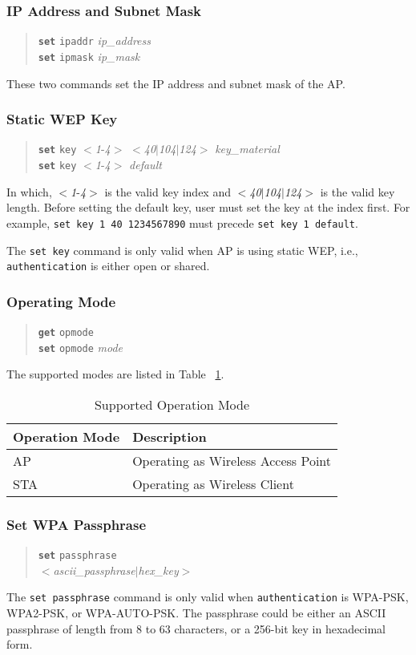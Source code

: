 \documentclass[10pt,fullpage]{article}
\newcommand{\mytt}[1]{{\texttt{#1}}}
\newcommand{\bv}{\begin{verse}}
\newcommand{\ev}{\end{verse}}
\newcommand{\clicmd}[1]{{\textbf{\texttt{#1}}}}
\newcommand{\cliparam}[1]{{\texttt{#1}}}
\newcommand{\clival}[1]{{\emph{#1}}}
\begin{document}
\subsubsection{IP Address and Subnet Mask}
\bv
\clicmd{set} \cliparam{ipaddr} \clival{ip\_address}\\
\clicmd{set} \cliparam{ipmask} \clival{ip\_mask}
\ev
These two commands set the IP address and subnet mask of the AP.

\subsubsection{Static WEP Key}
\bv
\clicmd{set} \cliparam{key} $<$\clival{1}-\clival{4}$>$
$<$\clival{40}$|$\clival{104}$|$\clival{124}$>$ \clival{key\_material}\\
\clicmd{set} \cliparam{key} $<$\clival{1}-\clival{4}$>$ \clival{default}
\ev
In which, $<$\clival{1}-\clival{4}$>$ is the valid key index and
$<$\clival{40}$|$\clival{104}$|$\clival{124}$>$ is the valid key length.
Before setting the default key, user must set the key at the index
first. For example, \mytt{set key 1 40 1234567890}
must precede \mytt{set key 1 default}.

The \mytt{set key} command is only valid when AP is using static WEP, i.e.,
\cliparam{authentication} is either open or shared.

\subsubsection{Operating Mode}
\bv
\clicmd{get} \cliparam{opmode}\\
\clicmd{set} \cliparam{opmode} \clival{mode}
\ev
The supported modes are listed in Table ~\ref{tab:opmode}.
\begin{table}[h*]
  \centering
  \begin{tabular}{|l|l|} \hline
    Operation Mode & Description \\ \hline
    AP & Operating as Wireless Access Point \\
    STA & Operating as Wireless Client \\ \hline
  \end{tabular}
  \caption{Supported Operation Mode}
  \label{tab:opmode}
\end{table}

\subsubsection{Set WPA Passphrase}
\bv
\clicmd{set} \cliparam{passphrase}\\
$<$\clival{ascii\_passphrase}$|$\clival{hex\_key}$>$
\ev
The \mytt{set passphrase} command is only valid when \cliparam{authentication} is 
WPA-PSK, WPA2-PSK, or WPA-AUTO-PSK. The passphrase could be either an ASCII passphrase
of length from 8 to 63 characters, or a 256-bit key in hexadecimal form.
\end{document}
